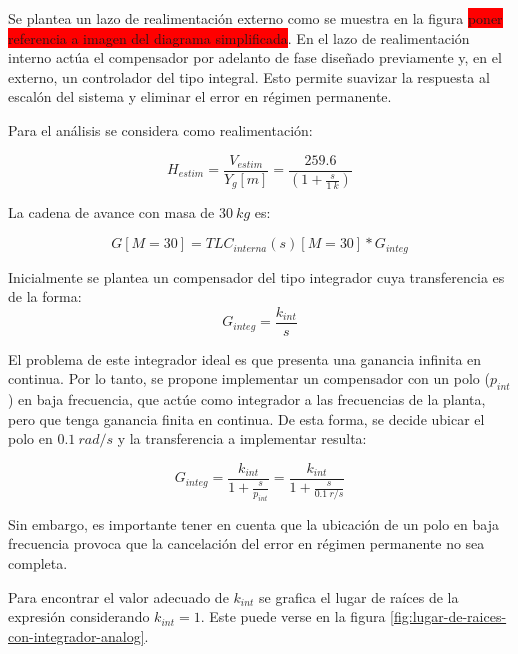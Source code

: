\noindent Se plantea un lazo de realimentación externo como se muestra en la  figura \colorbox{red}{poner referencia a imagen del diagrama simplificada}. En el lazo de realimentación interno actúa el compensador por adelanto de fase diseñado previamente y, en el externo, un controlador del tipo integral. Esto permite suavizar la respuesta al escalón del sistema y eliminar el error en régimen permanente.


\noindent Para el an\'{a}lisis se considera como realimentaci\'{o}n: 

\[H_{estim}=\frac{V_{estim}}{Y_g[m]}= \frac{259.6}{(1 + \frac{s}{1\:k})
}\] 

\noindent La cadena de avance con masa de $30\:kg$ es:

\begin{equation} \label{eq_cadena_avance_integrador}
	G[M=30]=TLC_{interna}(s)[M=30]*G_{integ}
\end{equation}


Inicialmente se plantea un compensador del tipo integrador cuya transferencia es de la forma:
\begin{equation}
	G_{integ}= \frac{k_{int}}{s}
\end{equation}

El problema de este integrador ideal es que presenta una ganancia infinita en continua. Por lo tanto, se propone implementar un compensador con un polo ($p_{int}$) en baja frecuencia, que actúe como integrador a las frecuencias de la planta, pero que tenga ganancia finita en continua. De esta forma, se decide ubicar el polo en $0.1\:rad/s$ y la transferencia a implementar resulta:

\begin{equation}
	G_{integ}=\frac{k_{int}}{1+\frac{s}{p_{int}}}=\frac{k_{int}}{1+\frac{s}{0.1\:r/s}}	
\end{equation}

Sin embargo, es importante tener en cuenta que la ubicación de un polo en baja frecuencia provoca que la cancelación del error en régimen permanente no sea completa.


Para encontrar el valor adecuado de $k_{int}$ se grafica el lugar de raíces de la expresión \label{eq_cadena_avance_integrador} considerando $k_{int}=1$. Este puede verse en la figura \ref{fig:lugar-de-raices-con-integrador-analog}.

